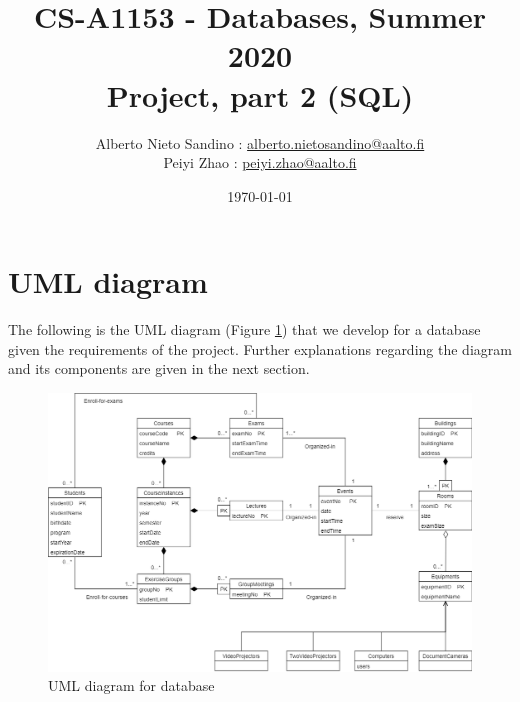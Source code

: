 \documentclass{article}
\title{CS-A1153 - Databases, Summer 2020\\
		Project, part 2 (SQL)}
\author{Alberto Nieto Sandino : \href{mailto:alberto.nietosandino@aalto.fi}{alberto.nietosandino@aalto.fi}\\
		Peiyi Zhao : \href{mailto:peiyi.zhao@aalto.fi}{peiyi.zhao@aalto.fi}}
\date{\today}
\begin{document}
\begin{titlepage}
	\maketitle
	\vspace{3cm}
	\tableofcontents
	\thispagestyle{empty}
\end{titlepage}

\cleardoublepage

\section{UML diagram}
The following is the UML diagram (Figure \ref{fig:UML}) that we develop for a database given the requirements of the project. Further explanations regarding the diagram and its components are given in the next section.

\begin{figure}[!h]
	\centering
	\includegraphics[width=\textwidth]{UML_project_1.png}
	\caption{UML diagram for database}
	\label{fig:UML}
\end{figure}
\end{document}
